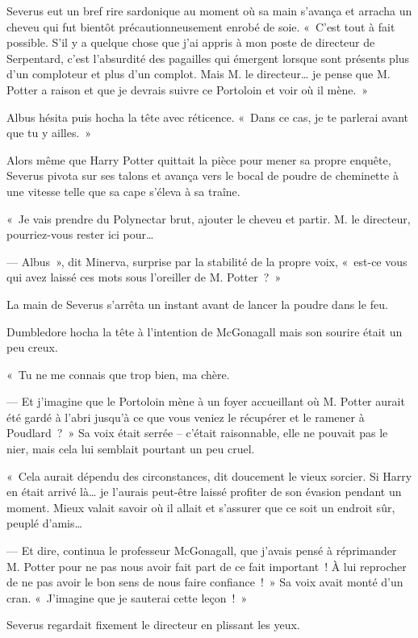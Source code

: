 Severus eut un bref rire sardonique au moment où sa main s'avança et arracha un cheveu qui fut bientôt précautionneusement enrobé de soie.
«~C'est tout à fait possible.
S'il y a quelque chose que j'ai appris à mon poste de directeur de Serpentard, c'est l'absurdité des pagailles qui émergent lorsque sont présents plus d'un comploteur et plus d'un complot.
Mais M. le directeur… je pense que M. Potter a raison et que je devrais suivre ce Portoloin et voir où il mène.~»

Albus hésita puis hocha la tête avec réticence.
«~Dans ce cas, je te parlerai avant que tu y ailles.~»

\later

Alors même que Harry Potter quittait la pièce pour mener sa propre enquête, Severus pivota sur ses talons et avança vers le bocal de poudre de cheminette à une vitesse telle que sa cape s'éleva à sa traîne.

«~Je vais prendre du Polynectar brut, ajouter le cheveu et partir.
M. le directeur, pourriez-vous rester ici pour…

--- Albus~», dit Minerva, surprise par la stabilité de la propre voix, «~est-ce vous qui avez laissé ces mots sous l'oreiller de M. Potter~?~»

La main de Severus s'arrêta un instant avant de lancer la poudre dans le feu.

Dumbledore hocha la tête à l'intention de McGonagall mais son sourire était un peu creux.

«~Tu ne me connais que trop bien, ma chère.

--- Et j'imagine que le Portoloin mène à un foyer accueillant où M. Potter aurait été gardé à l'abri jusqu'à ce que vous veniez le récupérer et le ramener à Poudlard~?~»
Sa voix était serrée -- c'était raisonnable, elle ne pouvait pas le nier, mais cela lui semblait pourtant un peu cruel.

«~Cela aurait dépendu des circonstances, dit doucement le vieux sorcier.
Si Harry en était arrivé là… je l'aurais peut-être laissé profiter de son évasion pendant un moment.
Mieux valait savoir où il allait et s'assurer que ce soit un endroit sûr, peuplé d'amis…

--- Et dire, continua le professeur McGonagall, que j'avais pensé à réprimander M. Potter pour ne pas nous avoir fait part de ce fait important~!
À lui reprocher de ne pas avoir le bon sens de nous faire confiance~!~»
Sa voix avait monté d'un cran.
«~J'imagine que je sauterai cette leçon~!~»

Severus regardait fixement le directeur en plissant les yeux.

